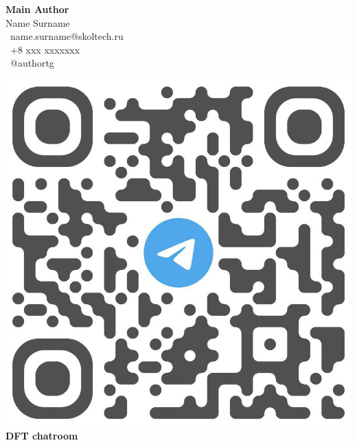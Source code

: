 {\begin{minipage}[t][1.8cm]{.32\textwidth}
\begin{minipage}{.64\textwidth}
    \footnotesize
    \textbf{Main Author}\\
    Name Surname \\
    \faEnvelope~name.surname@skoltech.ru \\
    \faMobile~+8 xxx xxxxxxx \\ 
    \faTelegram~@authortg
  
    \end{minipage}

    \hspace*{5.15cm} 
    \begin{minipage}{0.35\textwidth}
     \vspace{-2.05cm}
	  \begin{center}
      \includegraphics[height=0.60\textwidth]{logos/tg_link.png}
     {\hspace{0.15cm} \normalsize\bf\color{skgray}DFT chatroom}
	  \end{center}
 	\end{minipage}
    
  \end{minipage}
}
